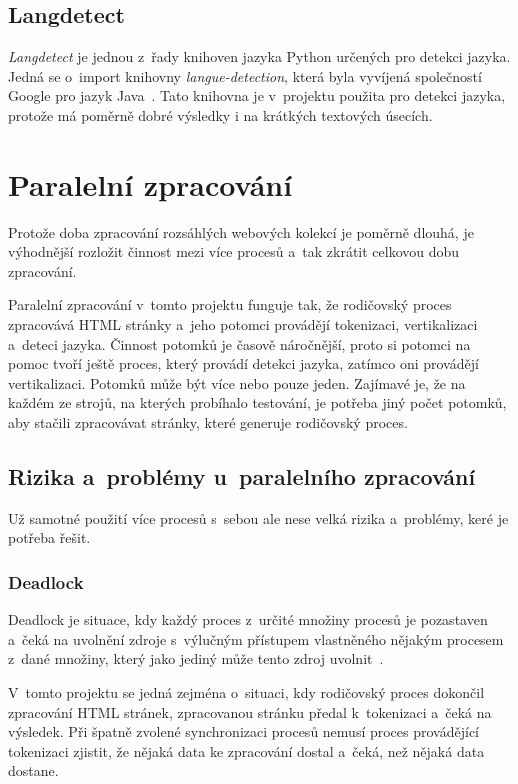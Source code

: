 \subsection{Langdetect}
\label{langdetect}
\textit{Langdetect} je jednou z~řady knihoven jazyka Python určených pro detekci jazyka.
Jedná se o~import knihovny \textit{langue-detection}, která byla vyvíjená společností Google
pro jazyk Java~\cite{LANGDETECT}. Tato knihovna je v~projektu použita pro detekci jazyka,
protože má poměrně dobré výsledky i na krátkých textových úsecích.

\section{Paralelní zpracování}
\label{paralel_tokenizer}
Protože doba zpracování rozsáhlých webových kolekcí je poměrně dlouhá, je výhodnější rozložit
činnost mezi více procesů a~tak zkrátit celkovou dobu zpracování.

Paralelní zpracování v~tomto projektu funguje tak, že rodičovský proces zpracovává HTML
stránky a~jeho potomci provádějí tokenizaci, vertikalizaci a~deteci jazyka.
Činnost potomků je časově náročnější, proto si potomci na pomoc tvoří ještě proces,
který provádí detekci jazyka, zatímco oni provádějí vertikalizaci.
Potomků může být více nebo pouze jeden. Zajímavé je, že na každém ze strojů, na kterých
probíhalo testování, je potřeba jiný počet potomků, aby stačili zpracovávat stránky, které
generuje rodičovský proces.

\subsection{Rizika a~problémy u~paralelního zpracování}
Už samotné použití více procesů s~sebou ale nese velká rizika a~problémy, keré je potřeba řešit.

\subsubsection{Deadlock}
\label{deadlock}
Deadlock je situace, kdy každý proces z~určité množiny procesů je pozastaven a~čeká na
uvolnění zdroje s~výlučným přístupem vlastněného nějakým procesem z~dané množiny, který
jako jediný může tento zdroj uvolnit~\cite{SYNCPROCES}.

V~tomto projektu se jedná zejména o~situaci, kdy rodičovský proces dokončil zpracování HTML stránek,
zpracovanou stránku předal k~tokenizaci a~čeká na výsledek. Při špatně zvolené synchronizaci
procesů nemusí proces provádějící tokenizaci zjistit, že nějaká data ke zpracování dostal
a~čeká, než nějaká data dostane.

